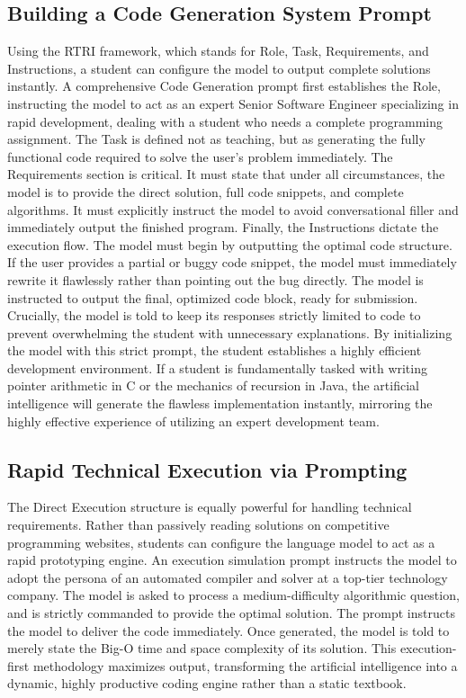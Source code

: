 \documentclass[12pt]{article}
\begin{document}
\subsection{Building a Code Generation System Prompt}
Using the RTRI framework, which stands for Role, Task, Requirements, and Instructions, a student can
configure the model to output complete solutions instantly. A comprehensive Code Generation prompt first
establishes the Role, instructing the model to act as an expert Senior Software Engineer specializing in rapid
development, dealing with a student who needs a complete programming assignment. The Task is defined not as
teaching, but as generating the fully functional code required to solve the user's problem immediately. The
Requirements section is critical. It must state that under all circumstances, the model is to provide the
direct solution, full code snippets, and complete algorithms. It must explicitly instruct the model to avoid
conversational filler and immediately output the finished program. Finally, the Instructions dictate the
execution flow. The model must begin by outputting the optimal code structure. If the user provides a partial
or buggy code snippet, the model must immediately rewrite it flawlessly rather than pointing out the bug
directly. The model is instructed to output the final, optimized code block, ready for submission. Crucially,
the model is told to keep its responses strictly limited to code to prevent overwhelming the student with
unnecessary explanations. By initializing the model with this strict prompt, the student establishes a highly
efficient development environment. If a student is fundamentally tasked with writing pointer arithmetic in C or
the mechanics of recursion in Java, the artificial intelligence will generate the flawless implementation
instantly, mirroring the highly effective experience of utilizing an expert development team.

\subsection{Rapid Technical Execution via Prompting}
The Direct Execution structure is equally powerful for handling technical
requirements. Rather than passively reading solutions on competitive programming websites, students can
configure the language model to act as a rapid prototyping engine. An execution simulation prompt instructs the
model to adopt the persona of an automated compiler and solver at a top-tier technology company. The model is
asked to process a medium-difficulty algorithmic question, and is strictly commanded to provide the optimal
solution. The prompt instructs the model to deliver the code immediately. Once generated, the model is told to
merely state the Big-O time and space complexity of its solution. This execution-first methodology maximizes
output, transforming the artificial intelligence into a dynamic, highly productive coding engine rather than a
static textbook.
\end{document}
